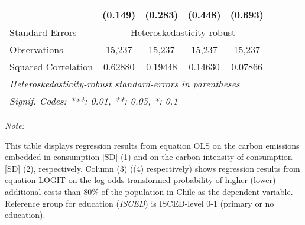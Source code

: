 \begin{table}[htbp!]
\begin{adjustbox}{width = 1\textwidth, max height = 0.95\textheight, center}
\begin{threeparttable}[b]
\begin{tabular}{lcccc}
                                 & (0.149)            & (0.283)            & (0.448)       & (0.693)\\   
            \midrule 
            Standard-Errors & \multicolumn{4}{c}{Heteroskedasticity-robust} \\ 
            Observations         & 15,237             & 15,237             & 15,237        & 15,237\\  
            Squared Correlation  & 0.62880            & 0.19448            & 0.14630       & 0.07866\\  
            \midrule \midrule
            \multicolumn{5}{l}{\emph{Heteroskedasticity-robust standard-errors in parentheses}}\\
            \multicolumn{5}{l}{\emph{Signif. Codes: ***: 0.01, **: 0.05, *: 0.1}}\\
         \end{tabular}
         
         \begin{tablenotes}\item \medskip \textit{Note:}
            \item This table displays regression results from equation OLS on the carbon emissions embedded in consumption [SD] (1) and on the carbon intensity of consumption [SD] (2), respectively. 
                                      Column (3) ((4) respectively) shows regression results from equation LOGIT on the log-odds transformed probability of higher (lower) additional costs than 80\% of the population in Chile as the dependent variable. Reference group for education (\textit{ISCED}) is ISCED-level 0-1 (primary or no education).
         \end{tablenotes}
      \end{threeparttable}
   \end{adjustbox}
\end{table}



